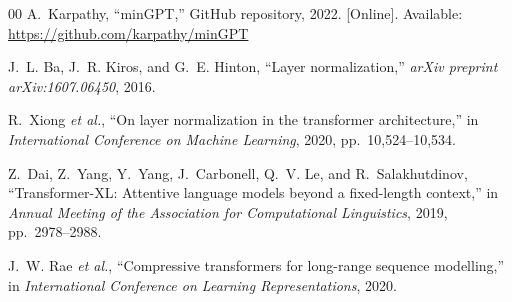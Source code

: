 \documentclass[conference]{IEEEtran}
\begin{document}
\begin{thebibliography}{00}
A.~Karpathy, ``minGPT,'' GitHub repository, 2022. [Online]. Available: \url{https://github.com/karpathy/minGPT}

J.~L. Ba, J.~R. Kiros, and G.~E. Hinton, ``Layer normalization,'' \textit{arXiv preprint arXiv:1607.06450}, 2016.

R.~Xiong \textit{et al.}, ``On layer normalization in the transformer architecture,'' in \textit{International Conference on Machine Learning}, 2020, pp.~10,524--10,534.

Z.~Dai, Z.~Yang, Y.~Yang, J.~Carbonell, Q.~V. Le, and R.~Salakhutdinov, ``Transformer-XL: Attentive language models beyond a fixed-length context,'' in \textit{Annual Meeting of the Association for Computational Linguistics}, 2019, pp.~2978--2988.

J.~W. Rae \textit{et al.}, ``Compressive transformers for long-range sequence modelling,'' in \textit{International Conference on Learning Representations}, 2020.

\end{thebibliography}
\end{document}
